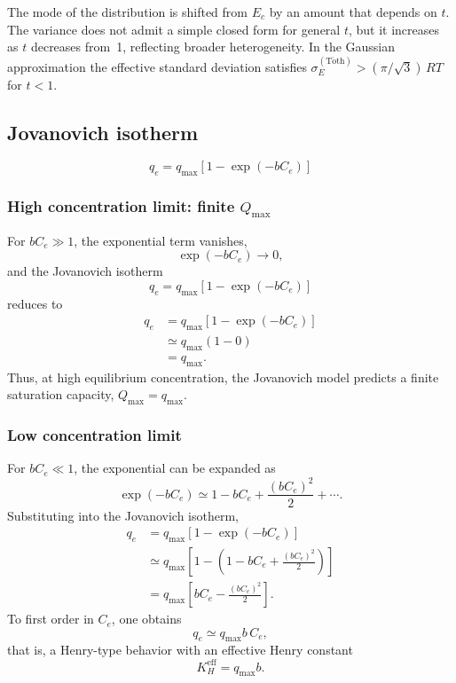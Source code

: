 \documentclass[12pt]{article}
\begin{document}
	The mode of the distribution is shifted from $E_c$ by an amount that
	depends on $t$. The variance does not admit a simple closed form for
	general $t$, but it increases as $t$ decreases from~1, reflecting
	broader heterogeneity. In the Gaussian approximation the effective
	standard deviation satisfies
	$\sigma_E^{\mathrm{(T\acute{o}th)}} > (\pi/\sqrt{3})\,RT$ for
	$t < 1$.


	\subsection{Jovanovich isotherm}
	\[
	q_e = q_{\max} \left[1 - \exp(-b C_e)\right]
	\]
	
	\subsubsection{High concentration limit: finite $Q_{\max}$}
	
	For $b C_e \gg 1$, the exponential term vanishes,
	\[
	\exp(-b C_e) \to 0,
	\]
	and the Jovanovich isotherm
	\[
	q_e = q_{\max} \left[1 - \exp(-b C_e)\right]
	\]
	reduces to
	\begin{align}
		q_e 
		&= q_{\max} \left[1 - \exp(-b C_e)\right] \nonumber \\
		&\simeq q_{\max} (1 - 0) \nonumber \\
		&= q_{\max}.
	\end{align}
	Thus, at high equilibrium concentration, the Jovanovich model predicts a finite saturation capacity, $Q_{\max} = q_{\max}$.
	
	\subsubsection{Low concentration limit}
	
	For $b C_e \ll 1$, the exponential can be expanded as
	\[
	\exp(-b C_e) \simeq 1 - b C_e + \frac{(b C_e)^2}{2} + \cdots.
	\]
	Substituting into the Jovanovich isotherm,
	\begin{align}
		q_e
		&= q_{\max} \left[1 - \exp(-b C_e)\right] \nonumber \\
		&\simeq q_{\max} \left[1 - \left(1 - b C_e + \frac{(b C_e)^2}{2}\right)\right] \nonumber \\
		&= q_{\max} \left[b C_e - \frac{(b C_e)^2}{2}\right].
	\end{align}
	To first order in $C_e$, one obtains
	\begin{equation}
		q_e \simeq q_{\max} b\, C_e,
	\end{equation}
	that is, a Henry-type behavior with an effective Henry constant
	\begin{equation}
		K_H^{\mathrm{eff}} = q_{\max} b.
	\end{equation}
\end{document}
